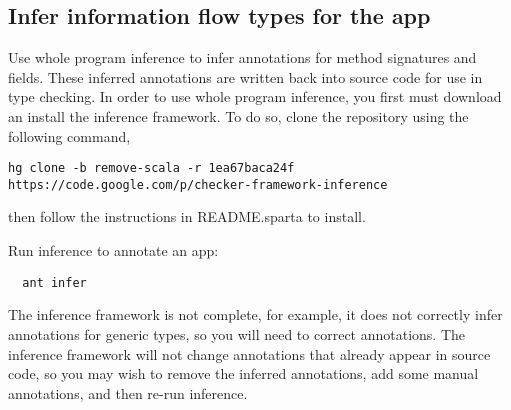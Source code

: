 %
%
%
%
%
%
%
%

\subsection{Infer information flow types for the app\label{flow-task-annotate-app}}
Use whole program inference to infer annotations for method signatures and fields.  
These inferred 
annotations are written back into source code for use in type checking.  In order to use whole program
inference, you first must download an install the inference framework.  To do so, clone the repository 
using the following command,
\begin{Verbatim}
hg clone -b remove-scala -r 1ea67baca24f https://code.google.com/p/checker-framework-inference
\end{Verbatim}
\noindent
then follow the instructions in README.sparta to install.

Run inference to annotate an app:

\begin{Verbatim}
  ant infer
\end{Verbatim}

The inference framework is not complete, for example, it does not correctly infer annotations 
for generic types, so you will need to correct annotations.  The inference framework will
not change annotations that already appear in source code, so you may wish to remove the inferred 
annotations, add some manual annotations, and then re-run inference. 

